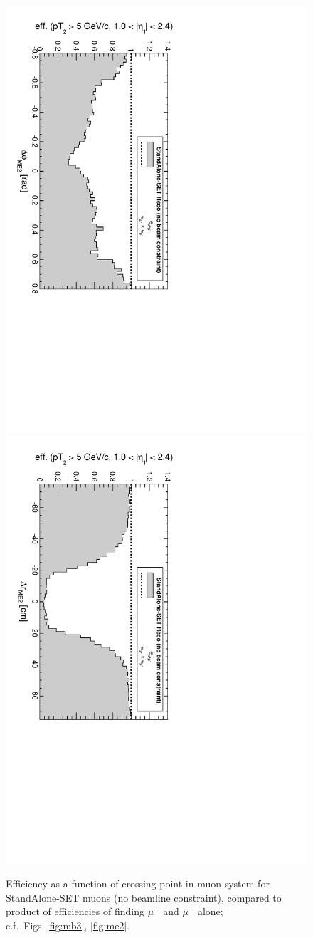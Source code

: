 \documentclass[12pt]{article}
\begin{document}
\begin{figure}[p]
\includegraphics[height=0.5\linewidth, angle=90]{fig/acceptance7_plot/vsme2dphi_StandAloneSET.pdf}
\includegraphics[height=0.5\linewidth, angle=90]{fig/acceptance7_plot/vsme2dr_StandAloneSET.pdf}

\caption{Efficiency as a function of crossing point in muon system for
  StandAlone-SET muons (no beamline constraint), compared to product of
  efficiencies of finding $\mu^+$ and $\mu^-$ alone;
  c.f.\ Figs~\ref{fig:mb3}, \ref{fig:me2}.}
\end{figure}
\end{document}
